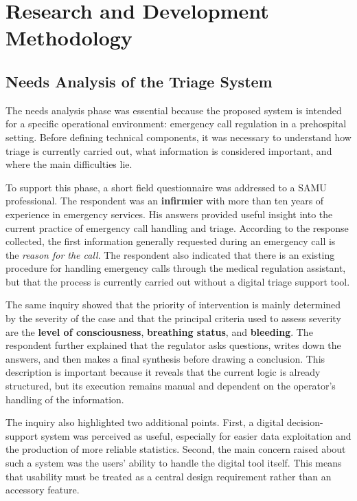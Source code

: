 \documentclass[a4paper,12pt,oneside]{report}
\begin{document}
\section{Research and Development Methodology}

\subsection{Needs Analysis of the Triage System}

The needs analysis phase was essential because the proposed system is intended for a specific operational environment: emergency call regulation in a prehospital setting. Before defining technical components, it was necessary to understand how triage is currently carried out, what information is considered important, and where the main difficulties lie.

To support this phase, a short field questionnaire was addressed to a SAMU professional. The respondent was an \textbf{infirmier} with more than ten years of experience in emergency services. His answers provided useful insight into the current practice of emergency call handling and triage. According to the response collected, the first information generally requested during an emergency call is the \textit{reason for the call}. The respondent also indicated that there is an existing procedure for handling emergency calls through the medical regulation assistant, but that the process is currently carried out without a digital triage support tool.

The same inquiry showed that the priority of intervention is mainly determined by the severity of the case and that the principal criteria used to assess severity are the \textbf{level of consciousness}, \textbf{breathing status}, and \textbf{bleeding}. The respondent further explained that the regulator asks questions, writes down the answers, and then makes a final synthesis before drawing a conclusion. This description is important because it reveals that the current logic is already structured, but its execution remains manual and dependent on the operator's handling of the information.

The inquiry also highlighted two additional points. First, a digital decision-support system was perceived as useful, especially for easier data exploitation and the production of more reliable statistics. Second, the main concern raised about such a system was the users' ability to handle the digital tool itself. This means that usability must be treated as a central design requirement rather than an accessory feature.
\end{document}
